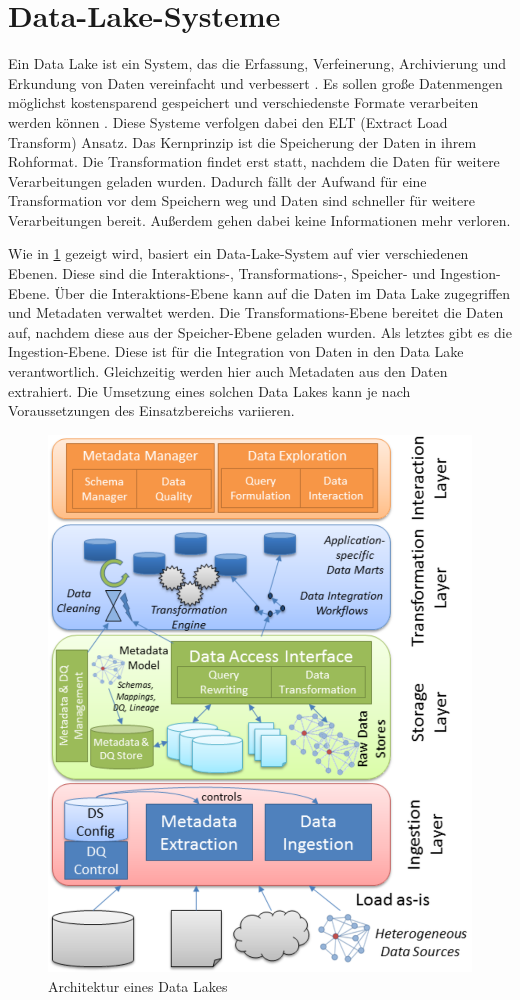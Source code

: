 \section{Data-Lake-Systeme}
\label{sec:einleitung-datalake}

Ein Data Lake ist ein System, das die Erfassung, Verfeinerung, Archivierung und Erkundung von Daten vereinfacht und verbessert \parencite{datalake_01}.
Es sollen große Datenmengen möglichst kostensparend gespeichert und verschiedenste Formate verarbeiten werden können \parencite{datalake_02}.
Diese Systeme verfolgen dabei den ELT (Extract Load Transform) Ansatz.
Das Kernprinzip ist die Speicherung der Daten in ihrem Rohformat.
Die Transformation findet erst statt, nachdem die Daten für weitere Verarbeitungen geladen wurden.
Dadurch fällt der Aufwand für eine Transformation vor dem Speichern weg und Daten sind schneller für weitere Verarbeitungen bereit.
Außerdem gehen dabei keine Informationen mehr verloren.

Wie in \cref{fig:datalake} gezeigt wird, basiert ein Data-Lake-System auf vier verschiedenen Ebenen.
Diese sind die Interaktions-, Transformations-, Speicher- und Ingestion-Ebene.
Über die Interaktions-Ebene kann auf die Daten im Data Lake zugegriffen und Metadaten verwaltet werden.
Die Transformations-Ebene bereitet die Daten auf, nachdem diese aus der Speicher-Ebene geladen wurden.
Als letztes gibt es die Ingestion-Ebene.
Diese ist für die Integration von Daten in den Data Lake verantwortlich.
Gleichzeitig werden hier auch Metadaten aus den Daten extrahiert.
Die Umsetzung eines solchen Data  Lakes kann je nach Voraussetzungen des Einsatzbereichs variieren.

\begin{figure}
    \centering
    \includegraphics[width=.645\textwidth]{Grafiken/data_lake_architecture.PNG}
    \caption{Architektur eines Data Lakes \parencite{datalake_03}}
    \label{fig:datalake}
\end{figure}
\vfill


